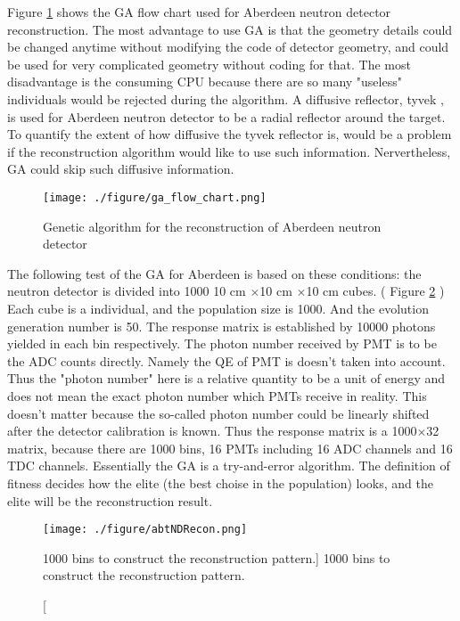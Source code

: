 Figure \ref{ga_flow_chart.png} shows the GA flow chart used for Aberdeen neutron detector reconstruction.
The most advantage to use GA is that the geometry details could be changed anytime without modifying the code of detector geometry,
and could be used for very complicated geometry without coding for that. The most disadvantage is the consuming
CPU because there are so many "useless" individuals would be rejected during the algorithm.
A diffusive reflector, tyvek
, is used for Aberdeen neutron detector to
be a radial reflector around the target. To quantify the extent of how diffusive the tyvek reflector is, would be a problem
if the reconstruction algorithm would like to use such information.
Nervertheless, GA could skip such diffusive information.


\begin{figure}
    \centering
    \texttt{[image: ./figure/ga\_flow\_chart.png]}
    \caption{Genetic algorithm for the reconstruction of Aberdeen neutron detector}
    \label{ga_flow_chart.png}
    \end{figure}


The following test of the GA for Aberdeen is based on these conditions:
the neutron detector is divided into 1000 10 cm $\times$10 cm $\times$10 cm cubes. ( Figure \ref{fig:abtNDRecon.png} )
Each cube is a individual, and the population size is 1000.
And the evolution generation number is 50.
The response matrix is established by 10000 photons yielded in each bin respectively.
The photon number received by PMT is to be the ADC counts directly.
Namely the QE of PMT is doesn't taken into account.
Thus the "photon number" here is a relative quantity to be a unit of energy and does not mean the exact
photon number which PMTs receive in reality.
This doesn't matter because the so-called photon number could be linearly shifted after the
detector calibration is known.
Thus the response matrix is a 1000$\times$32 matrix, because there are 1000 bins, 16 PMTs including
16 ADC channels and 16 TDC channels.
Essentially the GA is a try-and-error algorithm.
The definition of fitness decides how the elite (the best choise in the population) looks, and the elite
will be the reconstruction result.

\begin{figure}
    \centering
    \texttt{[image: ./figure/abtNDRecon.png]}
    \caption
    [1000 bins to construct the reconstruction pattern.]
    {1000 bins to construct the reconstruction pattern.}
    \label{fig:abtNDRecon.png}
    \end{figure}



